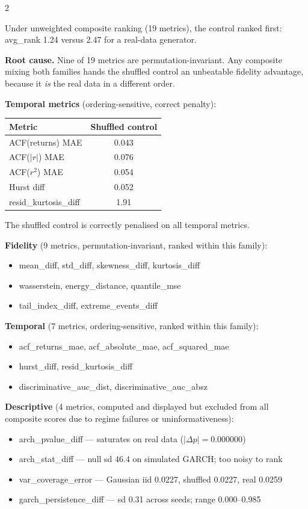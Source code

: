 \documentclass[10pt]{article}
\newcommand{\tealbox}[2]{\begin{tcolorbox}[mybox={Teal}{LBg},title={#1}]#2\end{tcolorbox}}
\begin{document}
\begin{multicols}{2}
{\smallskip
Under unweighted composite ranking (19 metrics), the control ranked first: avg\_rank 1.24 versus 2.47 for a real-data generator.

\textbf{Root cause.} Nine of 19 metrics are permutation-invariant. Any composite mixing both families hands the shuffled control an unbeatable fidelity advantage, because it \emph{is} the real data in a different order.

\textbf{Temporal metrics} (ordering-sensitive, correct penalty):
\begin{tabular}{@{}lc@{}}
\toprule
Metric & Shuffled control \\
\midrule
ACF(returns) MAE    & 0.043 \\
ACF($|r|$) MAE      & 0.076 \\
ACF($r^2$) MAE      & 0.054 \\
Hurst diff          & 0.052 \\
resid\_kurtosis\_diff & 1.91 \\
\bottomrule
\end{tabular}

The shuffled control is correctly penalised on all temporal metrics.}

\columnbreak

\tealbox{Metric Taxonomy}{%
\textbf{Fidelity} (9 metrics, permutation-invariant, ranked within this family):
\begin{itemize}[noitemsep,topsep=1pt]
  \item mean\_diff, std\_diff, skewness\_diff, kurtosis\_diff
  \item wasserstein, energy\_distance, quantile\_mse
  \item tail\_index\_diff, extreme\_events\_diff
\end{itemize}

\textbf{Temporal} (7 metrics, ordering-sensitive, ranked within this family):
\begin{itemize}[noitemsep,topsep=1pt]
  \item acf\_returns\_mae, acf\_absolute\_mae, acf\_squared\_mae
  \item hurst\_diff, resid\_kurtosis\_diff
  \item discriminative\_auc\_dist, discriminative\_auc\_absz
\end{itemize}

\textbf{Descriptive} (4 metrics, computed and displayed but excluded from all composite scores due to regime failures or uninformativeness):
\begin{itemize}[noitemsep,topsep=1pt]
  \item arch\_pvalue\_diff --- saturates on real data ($|\Delta p|=0.000000$)
  \item arch\_stat\_diff --- null sd 46.4 on simulated GARCH; too noisy to rank
  \item var\_coverage\_error --- Gaussian iid 0.0227, shuffled 0.0227, real 0.0259
  \item garch\_persistence\_diff --- sd 0.31 across seeds; range 0.000--0.985
\end{itemize}

}
\end{multicols}
\end{document}
